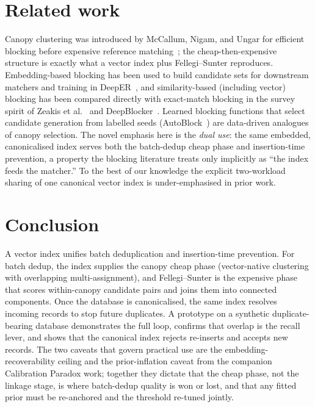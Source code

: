 \documentclass[11pt]{article}
\begin{document}
\section{Related work}
\label{sec:lit}
Canopy clustering was introduced by McCallum, Nigam, and Ungar for efficient blocking before
expensive reference matching~\cite{mccallum2000}; the cheap-then-expensive structure is
exactly what a vector index plus Fellegi--Sunter reproduces. Embedding-based blocking has been
used to build candidate sets for downstream matchers and training in DeepER~\cite{ebreheem2018},
and similarity-based (including vector) blocking has been compared directly with
exact-match blocking in the survey spirit of Zeakis et al.~\cite{zeakis2023} and
DeepBlocker~\cite{thirumuruganathan2021}. Learned blocking functions that select candidate
generation from labelled seeds (AutoBlock~\cite{zhang2020autoblock}) are data-driven analogues
of canopy selection. The novel emphasis here is the \emph{dual use}: the same embedded,
canonicalised index serves both the batch-dedup cheap phase and insertion-time prevention, a
property the blocking literature treats only implicitly as ``the index feeds the matcher.'' To
the best of our knowledge the explicit two-workload sharing of one canonical vector index is
under-emphasised in prior work.

\section{Conclusion}
\label{sec:concl}
A vector index unifies batch deduplication and insertion-time prevention. For batch dedup, the
index supplies the canopy cheap phase (vector-native clustering with overlapping
multi-assignment), and Fellegi--Sunter is the expensive phase that scores within-canopy
candidate pairs and joins them into connected components. Once the database is canonicalised,
the same index resolves incoming records to stop future duplicates. A prototype on a synthetic
duplicate-bearing database demonstrates the full loop, confirms that overlap is the recall
lever, and shows that the canonical index rejects re-inserts and accepts new records. The two
caveats that govern practical use are the embedding-recoverability ceiling and the
prior-inflation caveat from the companion Calibration Paradox work; together they dictate that
the cheap phase, not the linkage stage, is where batch-dedup quality is won or lost, and that
any fitted prior must be re-anchored and the threshold re-tuned jointly.
\end{document}
